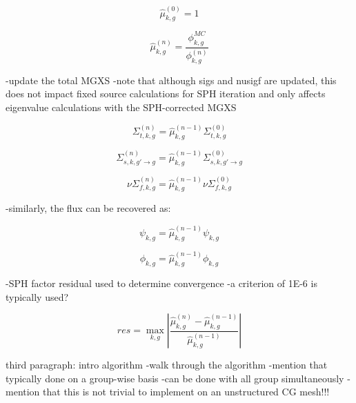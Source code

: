 \begin{dmath}
\label{eqn:chap6-sph-initial}
\hat{\mu}_{k,g}^{(0)} = 1
\end{dmath}

\begin{equation}
\label{eqn:chap6-sph-update}
\hat{\mu}_{k,g}^{(n)} = \frac{\phi_{k,g}^{MC}}{\phi_{k,g}^{(n)}}
\end{equation}

-update the total MGXS
-note that although sigs and nusigf are updated, this does not impact fixed source calculations for SPH iteration and only affects eigenvalue calculations with the SPH-corrected MGXS

\begin{dmath}
\label{eqn:chap6-sph-update-sigt}
\Sigma_{t,k,g}^{(n)} = \hat{\mu}_{k,g}^{(n-1)}\Sigma_{t,k,g}^{(0)}
\end{dmath}

\begin{dmath}
\label{eqn:chap6-sph-update-sigs}
\Sigma_{s,k,g'\rightarrow g}^{(n)} = \hat{\mu}_{k,g}^{(n-1)}\Sigma_{s,k,g'\rightarrow g}^{(0)}
\end{dmath}

\begin{dmath}
\label{eqn:chap6-sph-update-nusigf}
\nu\Sigma_{f,k,g}^{(n)} = \hat{\mu}_{k,g}^{(n-1)}\nu\Sigma_{f,k,g}^{(0)}
\end{dmath}

-similarly, the flux can be recovered as:

\begin{dmath}
\label{eqn:chap6-sph-update-angular-flux}
\psi_{k,g} = \hat{\mu}_{k,g}^{(n-1)}\psi_{k,g}
\end{dmath}

\begin{dmath}
\label{eqn:chap6-sph-update-scalar-flux}
\phi_{k,g} = \hat{\mu}_{k,g}^{(n-1)}\phi_{k,g}
\end{dmath}

-SPH factor residual used to determine convergence
-a criterion of 1E-6 is typically used?

\begin{dmath}
\label{eqn:chap6-sph-residual}
res = \max_{k,g} \left|\frac{\hat{\mu}_{k,g}^{(n)} - \hat{\mu}_{k,g}^{(n-1)}}{\hat{\mu}_{k,g}^{(n-1)}}\right|
\end{dmath}

third paragraph: intro algorithm
-walk through the algorithm
-mention that typically done on a group-wise basis
-can be done with all group simultaneously
-mention that this is not trivial to implement on an unstructured \ac{CG} mesh!!!

